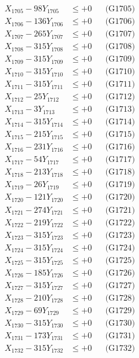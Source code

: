 \documentclass[a4paper,10pt]{article}
\begin{document}
{\begin{align}
X_{1705} - 98Y_{1705} &\leq +0 && \text{(G1705)} \\
X_{1706} - 136Y_{1706} &\leq +0 && \text{(G1706)} \\
X_{1707} - 265Y_{1707} &\leq +0 && \text{(G1707)} \\
X_{1708} - 315Y_{1708} &\leq +0 && \text{(G1708)} \\
X_{1709} - 315Y_{1709} &\leq +0 && \text{(G1709)} \\
X_{1710} - 315Y_{1710} &\leq +0 && \text{(G1710)} \\
\allowbreak
X_{1711} - 315Y_{1711} &\leq +0 && \text{(G1711)} \\
X_{1712} - 25Y_{1712} &\leq +0 && \text{(G1712)} \\
X_{1713} - 3Y_{1713} &\leq +0 && \text{(G1713)} \\
X_{1714} - 315Y_{1714} &\leq +0 && \text{(G1714)} \\
X_{1715} - 215Y_{1715} &\leq +0 && \text{(G1715)} \\
X_{1716} - 231Y_{1716} &\leq +0 && \text{(G1716)} \\
X_{1717} - 54Y_{1717} &\leq +0 && \text{(G1717)} \\
X_{1718} - 213Y_{1718} &\leq +0 && \text{(G1718)} \\
X_{1719} - 26Y_{1719} &\leq +0 && \text{(G1719)} \\
X_{1720} - 121Y_{1720} &\leq +0 && \text{(G1720)} \\
\allowbreak
X_{1721} - 274Y_{1721} &\leq +0 && \text{(G1721)} \\
X_{1722} - 219Y_{1722} &\leq +0 && \text{(G1722)} \\
X_{1723} - 315Y_{1723} &\leq +0 && \text{(G1723)} \\
X_{1724} - 315Y_{1724} &\leq +0 && \text{(G1724)} \\
X_{1725} - 315Y_{1725} &\leq +0 && \text{(G1725)} \\
X_{1726} - 185Y_{1726} &\leq +0 && \text{(G1726)} \\
X_{1727} - 315Y_{1727} &\leq +0 && \text{(G1727)} \\
X_{1728} - 210Y_{1728} &\leq +0 && \text{(G1728)} \\
X_{1729} - 69Y_{1729} &\leq +0 && \text{(G1729)} \\
X_{1730} - 315Y_{1730} &\leq +0 && \text{(G1730)} \\
\allowbreak
X_{1731} - 173Y_{1731} &\leq +0 && \text{(G1731)} \\
X_{1732} - 315Y_{1732} &\leq +0 && \text{(G1732)} \\

\end{align}}
\end{document}
